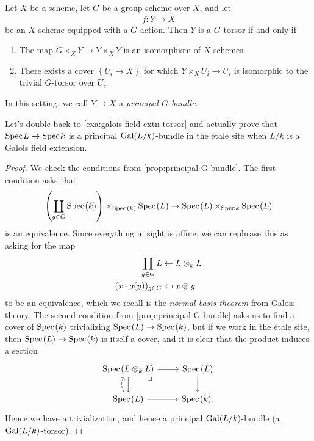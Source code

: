 \documentclass[11pt]{amsart}
\begin{document}
\begin{proposition}\label{prop:principal-G-bundle} 
Let $X$ be a scheme, let $G$ be a group scheme over $X$, and let
\begin{align*}
    f \colon Y \to X
\end{align*}
be an $X$-scheme equipped with a $G$-action. Then $Y$ is a $G$-torsor if and only if
\begin{enumerate}
    \item The map $G \times_X Y \to Y \times_X Y$ is an isomorphism of $X$-schemes.
    \item There exists a cover $\left\{ U_i \to X \right\}$ for which $Y \times_X U_i \to U_i$ is isomorphic to the trivial $G$-torsor over $U_i$.
\end{enumerate}
In this setting, we call $Y \to X$ a \textit{principal $G$-bundle}.
\end{proposition}

\begin{example} Let's double back to \autoref{exa:galois-field-extn-torsor} and actually prove that $\text{Spec}\hspace{0.1em} L \to \text{Spec}\hspace{0.1em} k$ is a principal $\mathrm{Gal}(L/k)$-bundle in the \'etale site when $L/k$ is a Galois field extension.
\end{example}
\begin{proof} We check the conditions from \autoref{prop:principal-G-bundle}. The first condition asks that
\begin{align*}
    \left(\coprod_{g\in G} \text{Spec}\hspace{0.1em}(k) \right) \times_{\text{Spec}\hspace{0.1em}(k)} \text{Spec}\hspace{0.1em} (L) \to \text{Spec}\hspace{0.1em}(L) \times_{\text{Spec}\hspace{0.1em} k} \text{Spec}\hspace{0.1em}(L)
\end{align*}
is an equivalence. Since everything in sight is affine, we can rephrase this as asking for the map
\begin{align*}
    \prod_{g\in G} L &\from L \otimes_k L \\
    (x \cdot g(y))_{g\in G} &\mapsfrom x \otimes y
\end{align*}
to be an equivalence, which we recall is the \textit{normal basis theorem} from Galois theory. The second condition from \autoref{prop:principal-G-bundle} asks us to find a cover of $\text{Spec}\hspace{0.1em}(k)$ trivializing $\text{Spec}\hspace{0.1em}(L) \to \text{Spec}\hspace{0.1em}(k)$, but if we work in the \'etale site, then $\text{Spec}\hspace{0.1em}(L) \to \text{Spec}\hspace{0.1em}(k)$ is itself a cover, and it is clear that the product induces a section
\[ \begin{tikzcd}
    \Spec(L \otimes_k L)\dar\rar\pb & \Spec(L)\dar\\
    \Spec(L)\rar\uar[dashed,bend left=30] & \Spec(k).
\end{tikzcd} \]
Hence we have a trivialization, and hence a principal $\mathrm{Gal}(L/k)$-bundle (a $\mathrm{Gal}(L/k)$-torsor).
\end{proof}
\end{document}
